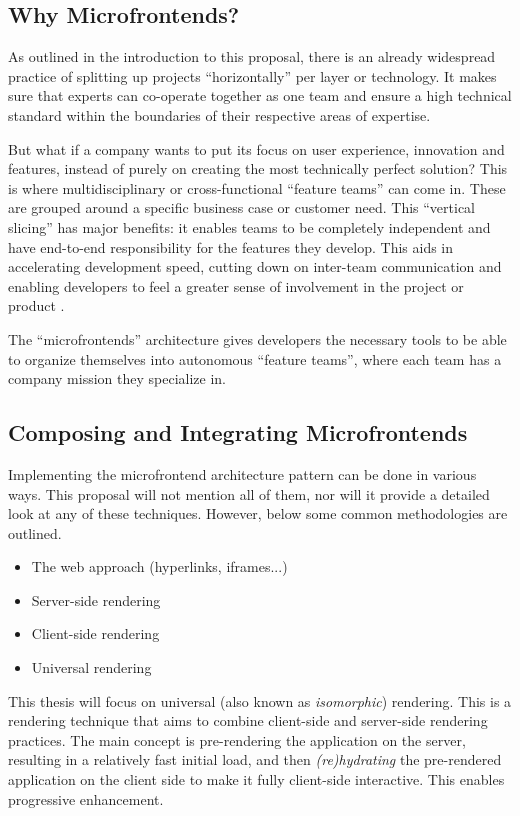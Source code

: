 \subsection{Why Microfrontends?}
As outlined in the introduction to this proposal, there is an already widespread
practice of splitting up projects ``horizontally'' per layer or technology. It
makes sure that experts can co-operate together as one team and ensure a high
technical standard within the boundaries of their respective areas of expertise.

But what if a company wants to put its focus on user experience, innovation and
features, instead of purely on creating the most technically perfect solution?
This is where multidisciplinary or cross-functional ``feature teams'' can come
in. These are grouped around a specific business case or customer need. This
``vertical slicing'' has major benefits: it enables teams to be completely
independent and have end-to-end responsibility for the features they develop.
This aids in accelerating development speed, cutting down on inter-team
communication and enabling developers to feel a greater sense of involvement in
the project or product \autocite{LarmanVodde_2008}.

The ``microfrontends'' architecture gives developers the necessary tools to be
able to organize themselves into autonomous ``feature teams'', where each team
has a company mission they specialize in. \autocite{Geers_2020}

\subsection{Composing and Integrating Microfrontends}
Implementing the microfrontend architecture pattern can be done in various
ways. This proposal will not mention all of them, nor will it provide a detailed
look at any of these techniques. However, below some common methodologies are
outlined. \autocite{Geers_2020} \autocite{Peltonen_etal_2020}
\autocite{Pavlenko_etal_2020}

\begin{itemize}
    \item The web approach (hyperlinks, iframes...)
    \item Server-side rendering
    \item Client-side rendering
    \item Universal rendering
\end{itemize}

This thesis will focus on universal (also known as \textit{isomorphic})
rendering. This is a rendering technique that aims to combine client-side and
server-side rendering practices. The main concept is pre-rendering the
application on the server, resulting in a relatively fast initial load, and then
\textit{(re)hydrating} the pre-rendered application on the client side to make
it fully client-side interactive. This enables progressive enhancement.
\autocite{MillerOsmani_2019}

